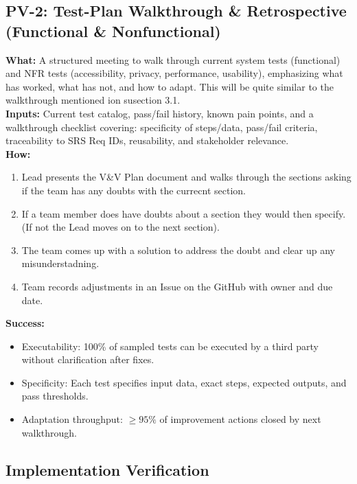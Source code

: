 \documentclass[12pt, titlepage]{article}
\begin{document}
\subsection*{PV-2: Test-Plan Walkthrough \& Retrospective (Functional \& Nonfunctional)}
\textbf{What:} A structured meeting to walk through current system tests (functional) and NFR tests (accessibility, privacy, performance, usability), emphasizing what has worked, what has not, and how to adapt. This will be quite similar to the walkthrough mentioned ion susection 3.1. \\
\textbf{Inputs:} Current test catalog, pass/fail history, known pain points, and a walkthrough checklist covering: specificity of steps/data, pass/fail criteria, traceability to SRS Req IDs, reusability, and stakeholder relevance. \\
\textbf{How:}
\begin{enumerate}
  \item Lead presents the V\&V Plan document and walks through the sections asking if the team has any doubts with the currecnt section.
  \item If a team member does have doubts about a section they would then specify. (If not the Lead moves on to the next section).
  \item The team comes up with a solution to address the doubt and clear up any misunderstadning.
  \item Team records adjustments in an Issue on the GitHub with owner and due date.
\end{enumerate}
\textbf{Success:}
\begin{itemize}
  \item Executability: 100\% of sampled tests can be executed by a third party without clarification after fixes.
  \item Specificity: Each test specifies input data, exact steps, expected outputs, and pass thresholds.
  \item Adaptation throughput: $\geq 95\%$ of improvement actions closed by next walkthrough.
\end{itemize}

\subsection{Implementation Verification}


\end{document}
